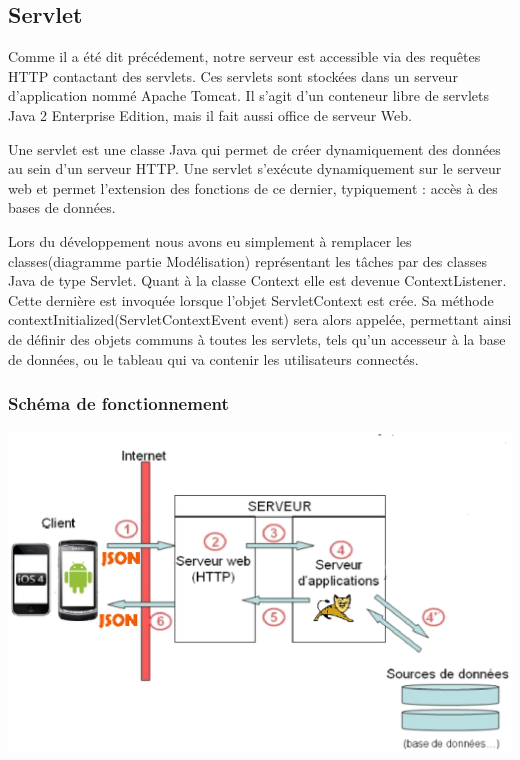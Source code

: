 \subsection{Servlet}
	Comme il a été dit précédement, notre serveur est accessible via des requêtes
	HTTP contactant des servlets. Ces servlets sont stockées dans un serveur
	d'application nommé Apache Tomcat. Il s'agit d'un conteneur libre de
	servlets Java 2 Enterprise Edition, mais il fait aussi office de serveur Web.
		
	Une servlet est une classe Java qui permet de créer dynamiquement des données
	au sein d'un serveur HTTP. Une servlet s'exécute dynamiquement sur le serveur
	web et permet l'extension des fonctions de ce dernier, typiquement : accès à
	des bases de données.
	
	Lors du développement nous avons eu simplement à remplacer les
	classes(diagramme partie Modélisation) représentant les tâches par des classes
	Java de type Servlet. 
	Quant à la classe Context elle est devenue ContextListener.
	Cette dernière est
	invoquée lorsque l'objet ServletContext	est crée. Sa méthode contextInitialized(ServletContextEvent event) sera
	alors appelée, permettant ainsi de définir des objets communs à toutes les
	servlets, tels qu'un accesseur à la base de données, ou le tableau qui va
	contenir les utilisateurs connectés.
		

	\subsubsection{Schéma de fonctionnement }
		
		\begin{center}
			\includegraphics[width=16cm]{Analyse/Img/serveurappli.eps}
		\end{center}
		
